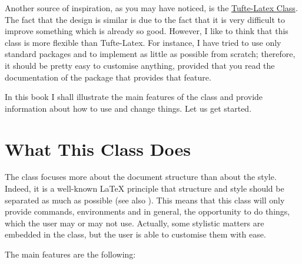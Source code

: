 Another source of inspiration, as you may have noticed, is the 
\href{https://github.com/Tufte-LaTeX/tufte-latex}{Tufte-Latex Class}. 
The fact that the design is similar is due to the fact that it is very 
difficult to improve something which is already so good. However, I like 
to think that this class is more flexible than Tufte-Latex. For 
instance, I have tried to use only standard packages and to implement as 
little as possible from scratch; therefore, it should be pretty easy 
to customise anything, provided that you read the documentation of the 
package that provides that feature.

In this book I shall illustrate the main features of the class and 
provide information about how to use and change things. Let us get 
started.

\section{What This Class Does}

The  class focuses more about the document structure than 
about the style. Indeed, it is a well-known \LaTeX\xspace principle that 
structure and style should be separated as much as possible (see also 
). This means that this class will only provide 
commands, environments and in general, the opportunity to do things, 
which the user may or may not use. Actually, some stylistic matters are 
embedded in the class, but the user is able to customise them with ease.

The main features are the following:

